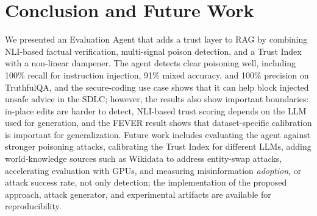 \section{Conclusion and Future Work}
\label{sec:conclusion}

We presented an Evaluation Agent that adds a trust layer to RAG by combining NLI-based factual verification, multi-signal poison detection, and a Trust Index with a non-linear dampener. The agent detects clear poisoning well, including 100\% recall for instruction injection, 91\% mixed accuracy, and 100\% precision on TruthfulQA, and the secure-coding use case shows that it can help block injected unsafe advice in the SDLC; however, the results also show important boundaries: in-place edits are harder to detect, NLI-based trust scoring depends on the LLM used for generation, and the FEVER result shows that dataset-specific calibration is important for generalization. Future work includes evaluating the agent against stronger poisoning attacks, calibrating the Trust Index for different LLMs, adding world-knowledge sources such as Wikidata to address entity-swap attacks, accelerating evaluation with GPUs, and measuring misinformation \emph{adoption}, or attack success rate, not only detection; the implementation of the proposed approach, attack generator, and experimental artifacts are available for reproducibility.


